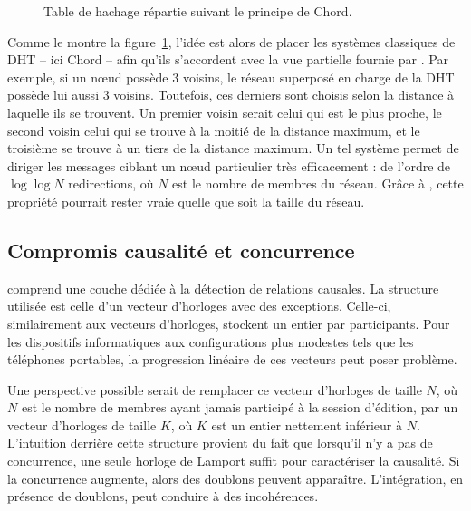 \begin{figure}
  \begin{center}
    
    \caption[Table de hachage répartie]
    {\label{conclu:fig:dhtexample}Table de hachage répartie suivant le principe
      de Chord.}
  \end{center}
\end{figure}

Comme le montre la figure~\ref{conclu:fig:dhtexample}, l'idée est alors de
placer les systèmes classiques de DHT -- ici Chord -- afin qu'ils s'accordent
avec la vue partielle fournie par \SPRAY. Par exemple, si un nœud \SPRAY possède
3 voisins, le réseau superposé en charge de la DHT possède lui aussi 3
voisins. Toutefois, ces derniers sont choisis selon la distance à laquelle ils
se trouvent. Un premier voisin serait celui qui est le plus proche, le second
voisin celui qui se trouve à la moitié de la distance maximum, et le troisième
se trouve à un tiers de la distance maximum. Un tel système permet de diriger les
messages ciblant un nœud particulier très efficacement : de l'ordre de
$\log\log N$ redirections, où $N$ est le nombre de membres du réseau. Grâce à
\SPRAY, cette propriété pourrait rester vraie quelle que soit la taille du
réseau.



\subsection{Compromis causalité et concurrence}

\CRATE comprend une couche dédiée à la détection de relations causales. La
structure utilisée est celle d'un vecteur d'horloges avec des
exceptions. Celle-ci, similairement aux vecteurs d'horloges, stockent un entier
par participants. Pour les dispositifs informatiques aux configurations plus
modestes tels que les téléphones portables, la progression linéaire de ces
vecteurs peut poser problème. 

Une perspective possible serait de remplacer ce vecteur d'horloges de taille
$N$, où $N$ est le nombre de membres ayant jamais participé à la session
d'édition, par un vecteur d'horloges de taille $K$, où $K$ est un entier
nettement inférieur à $N$. L'intuition derrière cette structure provient du
fait que lorsqu'il n'y a pas de concurrence, une seule horloge de Lamport suffit
pour caractériser la causalité. Si la concurrence augmente, alors des doublons
peuvent apparaître. L'intégration, en présence de doublons, peut conduire à des
incohérences.

